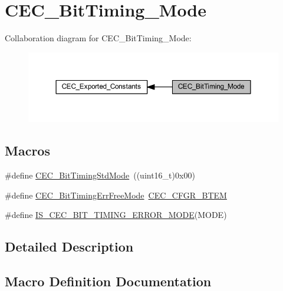 \hypertarget{group___c_e_c___bit_timing___mode}{}\section{C\+E\+C\+\_\+\+Bit\+Timing\+\_\+\+Mode}
\label{group___c_e_c___bit_timing___mode}
Collaboration diagram for C\+E\+C\+\_\+\+Bit\+Timing\+\_\+\+Mode\+:
\nopagebreak
\begin{figure}[H]
\begin{center}
\leavevmode
\includegraphics[width=350pt]{group___c_e_c___bit_timing___mode}
\end{center}
\end{figure}
\subsection*{Macros}
\begin{DoxyCompactItemize}
\item 
\#define \hyperlink{group___c_e_c___bit_timing___mode_gaf6866e5087bb01c1ea4e20a207a1f691}{C\+E\+C\+\_\+\+Bit\+Timing\+Std\+Mode}~((uint16\+\_\+t)0x00)
\item 
\#define \hyperlink{group___c_e_c___bit_timing___mode_ga4fd44675c774985d1f6cd8976b18c947}{C\+E\+C\+\_\+\+Bit\+Timing\+Err\+Free\+Mode}~\hyperlink{group___peripheral___registers___bits___definition_ga8b06cd4e47f4235d8880e1ba0e56e2d7}{C\+E\+C\+\_\+\+C\+F\+G\+R\+\_\+\+B\+T\+EM}
\item 
\#define \hyperlink{group___c_e_c___bit_timing___mode_ga55494269b2c9c55c11130a429f418a8d}{I\+S\+\_\+\+C\+E\+C\+\_\+\+B\+I\+T\+\_\+\+T\+I\+M\+I\+N\+G\+\_\+\+E\+R\+R\+O\+R\+\_\+\+M\+O\+DE}(M\+O\+DE)
\end{DoxyCompactItemize}


\subsection{Detailed Description}


\subsection{Macro Definition Documentation}
\mbox{\label{group___c_e_c___bit_timing___mode_ga4fd44675c774985d1f6cd8976b18c947}} 

